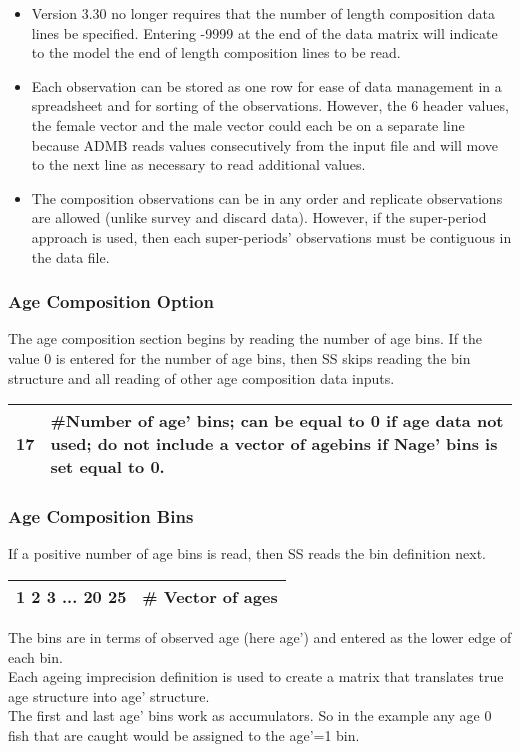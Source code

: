 \begin{description}
\begin{itemize}
		\item Version 3.30 no longer requires that the number of length composition data lines be specified.  Entering -9999 at the end of the data matrix will indicate to the model the end of length composition lines to be read.
		\item Each observation can be stored as one row for ease of data management in a spreadsheet and for sorting of the observations.  However, the 6 header values, the female vector and the male vector could each be on a separate line because ADMB reads values consecutively from the input file and will move to the next line as necessary to read additional values.
		\item The composition observations can be in any order and replicate observations are allowed (unlike survey and discard data).  However, if the super-period approach is used, then each super-periods’ observations must be contiguous in the data file.
	\end{itemize}
\end{description}

\subsubsection{Age Composition Option}
The age composition section begins by reading the number of age bins.  If the value 0 is entered for the number of age bins, then SS skips reading the bin structure and all reading of other age composition data inputs.
\begin{center}
	\begin{tabular}{p{3cm} p{12cm}  }
		\hline
		17 & \#Number of age' bins; can be equal to 0 if age data not used; do not include a vector of agebins if Nage' bins is set equal to 0.\\
		\hline
	\end{tabular}
\end{center}


\subsubsection{Age Composition Bins}
If a positive number of age bins is read, then SS reads the bin definition next.
\begin{center}
	\begin{tabular}{p{3cm} p{12cm}  }
		\hline
		1 2 3 ... 20 25 & \# Vector of ages\\
		\hline		
	\end{tabular}
\end{center}
The bins are in terms of observed age (here age’) and entered as the lower edge of each bin.
\\Each ageing imprecision definition is used to create a matrix that translates true age structure into age' structure.
\\The first and last age' bins work as accumulators.  So in the example any age 0 fish that are caught would be assigned to the age’=1 bin.

